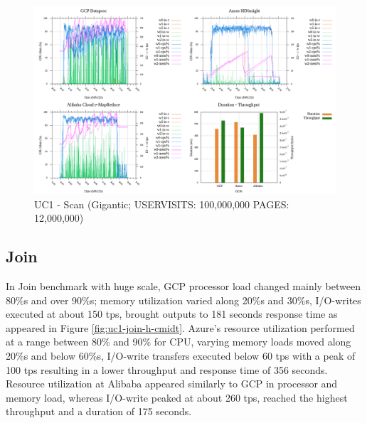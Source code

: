 \documentclass[review]{elsarticle}
\begin{document}
\begin{figure}[p]
	\caption{UC1 - Scan (Gigantic; USERVISITS: 100,000,000 PAGES: 12,000,000)}
	\label{fig:uc1-scan-g-cmidt}
	\includegraphics[width=\textwidth]{uc1-scan-g-cmidt}
	\centering
\end{figure}

\subsection{Join}
In Join benchmark with huge scale, GCP processor load changed mainly between 80\%s and over 90\%s; memory utilization varied along 20\%s and 30\%s, I/O-writes executed at about 150 tps, brought outputs to 181 seconds response time as appeared in Figure \ref{fig:uc1-join-h-cmidt}. Azure's resource utilization performed at a range between 80\% and 90\% for CPU, varying memory loads moved along 20\%s and below 60\%s, I/O-write transfers executed below 60 tps with a peak of 100 tps resulting in a lower throughput and response time of 356 seconds. Resource utilization at Alibaba appeared similarly to GCP in processor and memory load, whereas I/O-write peaked at about 260 tps, reached the highest throughput and a duration of 175 seconds.
\end{document}
